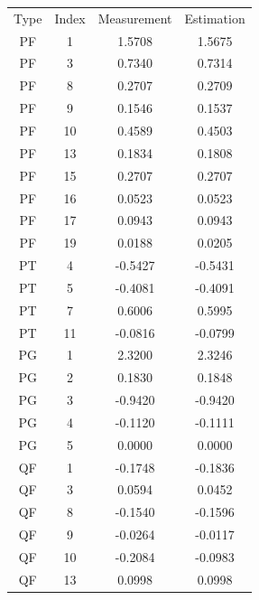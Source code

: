 \documentclass[a4paper]{article}
\begin{document}
\begin{table} [ht]
\centering
\begin{tabular} {c|c|c|c}
\hline
    Type    &    Index &    Measurement &  Estimation \\
      PF    &      1   &       1.5708   &      1.5675 \\
      PF    &      3   &       0.7340   &      0.7314 \\
      PF    &      8   &       0.2707   &      0.2709 \\
      PF    &      9   &       0.1546   &      0.1537 \\
      PF    &     10   &       0.4589   &      0.4503 \\
      PF    &     13   &       0.1834   &      0.1808 \\
      PF    &     15   &       0.2707   &      0.2707 \\
      PF    &     16   &       0.0523   &      0.0523 \\
      PF    &     17   &       0.0943   &      0.0943 \\
      PF    &     19   &       0.0188   &      0.0205 \\
      PT    &      4   &      -0.5427   &     -0.5431 \\
      PT    &      5   &      -0.4081   &     -0.4091 \\
      PT    &      7   &       0.6006   &      0.5995 \\
      PT    &     11   &      -0.0816   &     -0.0799 \\
      PG    &      1   &       2.3200   &      2.3246 \\
      PG    &      2   &       0.1830   &      0.1848 \\
      PG    &      3   &      -0.9420   &     -0.9420 \\
      PG    &      4   &      -0.1120   &     -0.1111 \\
      PG    &      5   &       0.0000   &      0.0000 \\
      QF    &      1   &      -0.1748   &     -0.1836 \\
      QF    &      3   &       0.0594   &      0.0452 \\
      QF    &      8   &      -0.1540   &     -0.1596 \\
      QF    &      9   &      -0.0264   &     -0.0117 \\
      QF    &     10   &      -0.2084   &     -0.0983 \\
      QF    &     13   &       0.0998   &      0.0998 \\

\end{tabular}
\end{table}
\end{document}
